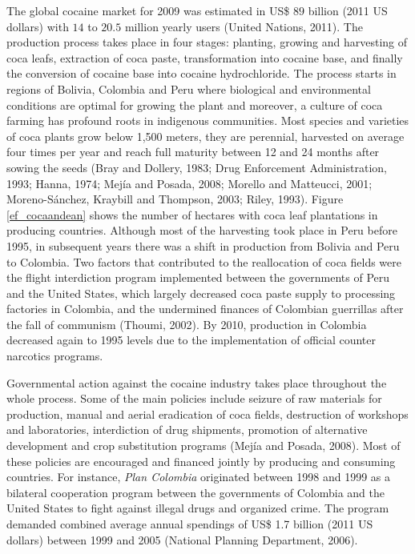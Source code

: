 \documentclass[a4paper, 12pt]{article}
\begin{document}
The global cocaine market for 2009 was estimated in US\$ $89$ billion (2011 US dollars) with $14$ to $20.5$ million yearly users (United Nations, 2011). The production process takes place in four stages: planting, growing and harvesting of coca leafs, extraction of coca paste, transformation into cocaine base, and finally the conversion of cocaine base into cocaine hydrochloride. The process starts in regions of Bolivia, Colombia and Peru where biological and environmental conditions are optimal for growing the plant and moreover, a culture of coca farming has profound roots in indigenous communities. Most species and varieties of coca plants grow below 1,500 meters, they are perennial, harvested on average four times per year and reach full maturity between 12 and 24 months after sowing the seeds (Bray and Dollery, 1983; Drug Enforcement Administration, 1993; Hanna, 1974; Mej\'{i}a and Posada, 2008; Morello and Matteucci, 2001; Moreno-S\'{a}nchez, Kraybill and Thompson, 2003; Riley, 1993). Figure \ref{ef_cocaandean} shows the number of hectares with coca leaf plantations in producing countries. Although most of the harvesting took place in Peru before 1995, in subsequent years there was a shift in production from Bolivia and Peru to Colombia. Two factors that contributed to the reallocation of coca fields were the flight interdiction program implemented between the governments of Peru and the United States, which largely decreased coca paste supply to processing factories in Colombia, and the undermined finances of Colombian guerrillas after the fall of communism (Thoumi, 2002). By 2010, production in Colombia decreased again to 1995 levels due to the implementation of official counter narcotics programs.

Governmental action against the cocaine industry takes place throughout the whole process. Some of the main policies include seizure of raw materials for production, manual and aerial eradication of coca fields, destruction of workshops and laboratories, interdiction of drug shipments, promotion of alternative development and crop substitution programs (Mej\'{i}a and Posada, 2008). Most of these policies are encouraged and financed jointly by producing and consuming countries. For instance, \emph{Plan Colombia} originated between 1998 and 1999 as a bilateral cooperation program between the governments of Colombia and the United States to fight against illegal drugs and organized crime. The program demanded combined average annual spendings of US\$ 1.7 billion (2011 US dollars) between 1999 and 2005 (National Planning Department, 2006). 
\end{document}

